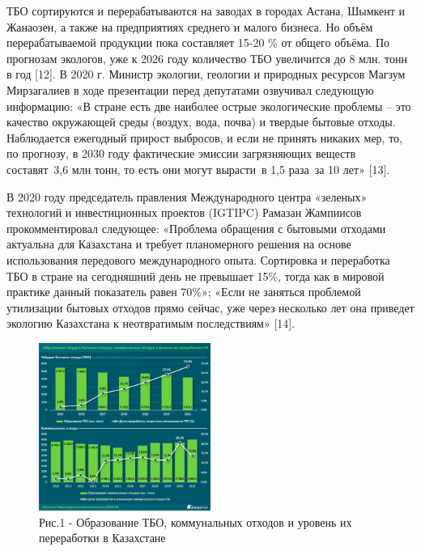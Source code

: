 \begin{multicols}{2}
ТБО сортируются и перерабатываются на заводах в городах Астана, Шымкент
и Жанаозен, а также на предприятиях среднего и малого бизнеса. Но объём
перерабатываемой продукции пока составляет 15-20 \% от общего объёма. По
прогнозам экологов, уже к 2026 году количество ТБО увеличится до 8 млн.
тонн в год {[}12{]}. В 2020 г. Министр экологии, геологии и природных
ресурсов Магзум Мирзагалиев в ходе презентации перед депутатами
озвучивал следующую информацию: «В стране есть две наиболее острые
экологические проблемы -- это качество окружающей среды (воздух, вода,
почва) и твердые бытовые отходы. Наблюдается ежегодный прирост выбросов,
и если не принять никаких мер, то, по прогнозу, в 2030 году фактические
эмиссии загрязняющих веществ составят~3,6 млн тонн, то есть они могут
вырасти~в 1,5 раза~за 10 лет» {[}13{]}.

В 2020 году председатель правления Международного центра «зеленых»
технологий и инвестиционных проектов (IGTIPC) Рамазан Жампиисов
прокомментировал следующее: «Проблема обращения с бытовыми отходами
актуальна для Казахстана и требует планомерного решения на основе
использования передового международного опыта. Сортировка и переработка
ТБО в стране на сегодняшний день не превышает 15\%, тогда как в мировой
практике данный показатель равен 70\%»; «Если не заняться проблемой
утилизации бытовых отходов прямо сейчас, уже через несколько лет она
приведет экологию Казахстана к неотвратимым последствиям» {[}14{]}.~
\end{multicols}

\begin{figure}[H]
	\centering
	\includegraphics[width=0.5\textwidth]{media/chem2/image66}
	\caption*{Рис.1 - Образование ТБО, коммунальных отходов и уровень их переработки в Казахстане}
\end{figure}

